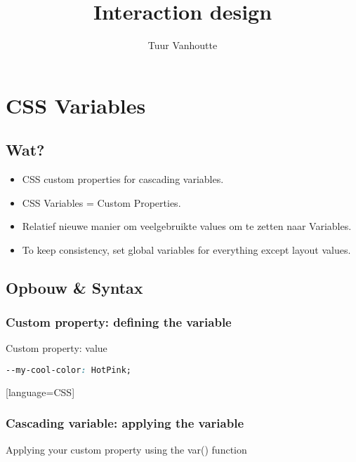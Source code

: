 \documentclass{article}
\begin{document}
\begin{titlepage}
    \author{Tuur Vanhoutte}
    \title{Interaction design}
\end{titlepage}

\maketitle
\newpage
\tableofcontents
\newpage


\section{CSS Variables}

\subsection{Wat?}

\begin{itemize}
    \item CSS custom properties for cascading variables.
    \item CSS Variables = Custom Properties.
    \item Relatief nieuwe manier om veelgebruikte values om te zetten naar Variables.
    \item To keep consistency, set global variables for everything except layout values.
\end{itemize}

\subsection{Opbouw \& Syntax}

\subsubsection{Custom property: defining the variable}
Custom property: value

\begin{lstlisting}[language=CSS]
--my-cool-color: HotPink;
\end{lstlisting}[language=CSS]

\subsubsection{Cascading variable: applying the variable}

Applying your custom property using the var() function
\end{document}

